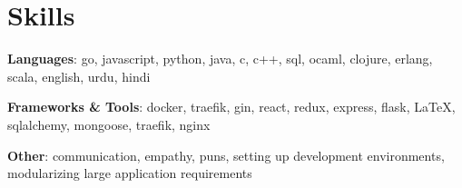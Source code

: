 \documentclass[letterpaper]{deedy-resume} %
\begin{document}
\begin{minipage}[t]{1.0\textwidth}
\section{Skills}

\textbf{Languages}: go, javascript, python, java, c, c++, sql, ocaml, clojure, erlang, scala, english, urdu, hindi

\textbf{Frameworks \& Tools}: docker, traefik, gin, react, redux, express, flask, \LaTeX, sqlalchemy, mongoose, traefik, nginx

\textbf{Other}: communication, empathy, puns, setting up development environments, modularizing large application requirements



\end{minipage} %
\end{document}
